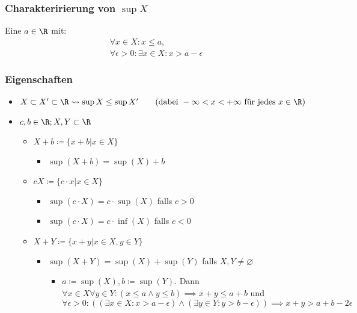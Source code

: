 \subsubsection{Charakteririerung von $\sup X$}
Eine $a \in \R$ mit:\\
\begin{gather*}
	\forall x \in X : x \leq a, \\
	\forall \epsilon > 0 : \exists x \in X : x > a - \epsilon
\end{gather*}

\subsubsection{Eigenschaften}
\begin{itemize}
	\item $X \subset X' \subset \R \rightsquigarrow \sup X \leq \sup X' \qquad (\text{dabei } -\infty < x < +\infty \text{ für jedes } x \in \R )$
	\item $c, b \in \R ; X, Y \subset \R$
	\begin{itemize}
		\item $X + b \coloneqq \{ x + b | x \in X \}$
		\begin{itemize}
			\item $\sup(X + b) = \sup(X) + b$
		\end{itemize}
		\item $c \dot X \coloneqq \{ c \cdot x | x \in X \}$
		\begin{itemize}
			\item $\sup(c \cdot X) = c \cdot \sup(X)$ falls $c > 0$
			\item $\sup(c \cdot X) = c \cdot \inf(X)$ falls $c < 0$
		\end{itemize}
		\item $X + Y \coloneqq \{ x + y | x \in X , y \in Y \}$
		\begin{itemize}
			\item $\sup(X + Y) = \sup(X) + \sup(Y)$ falls $X, Y \neq \varnothing$
			\begin{itemize}
				\item $a \coloneqq \sup(X) , b \coloneqq \sup(Y)$. Dann\\
					$\forall x \in X \forall y \in Y : ( x \leq a \wedge y \leq b ) \implies x + y \leq a + b$ und \\
					$\forall \epsilon > 0 : (( \exists x \in X : x > a - \epsilon ) \wedge ( \exists y \in Y : y > b - \epsilon )) \implies x + y > a + b - 2 \epsilon$
			\end{itemize}
		\end{itemize}
	\end{itemize}
\end{itemize}
